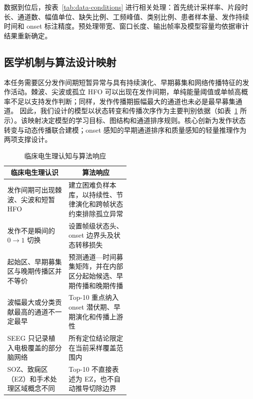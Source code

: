 \documentclass{cumcmthesis}
\numberwithin{figure}{section} %
\numberwithin{table}{section} %
\begin{document}
数据到位后，按表~\ref{tab:data-conditions} 进行相关处理：首先统计采样率、片段时长、通道数、幅值单位、缺失比例、工频峰值、类别比例、患者样本量、发作持续时间和 onset 标注精度。预处理带宽、窗口长度、输出帧率及模型容量均依据审计结果重新确定。


\subsection{医学机制与算法设计映射}

本任务需要区分发作间期短暂异常与具有持续演化、早期募集和网络传播特征的发作活动。棘波、尖波或孤立 HFO 可以出现在发作间期，单纯能量阈值或单帧高概率不足以支持发作判断；同样，发作传播期振幅最大的通道也未必是最早募集通道。
因此，我们设计的模型以状态转变和传播次序作为主要判别依据（如表~\ref{tab:clinical-response} 所示）。该映射决定模型的学习目标、图结构和通道排序规则。核心创新为发作状态转变与动态传播联合建模；onset 感知的早期通道排序和质量感知的轻量推理作为两项支撑设计。

\begin{table}[htbp]
    \centering
    \caption{临床电生理认知与算法响应}
    \label{tab:clinical-response}

    \renewcommand{\arraystretch}{1.5}
    \setlength{\tabcolsep}{5pt}

    \begin{tabularx}{\linewidth}{@{}
        p{0.50\linewidth}
        X
    @{}}
        \toprule[1pt]
        \multicolumn{1}{c}{\textbf{临床电生理认识}} &
        \multicolumn{1}{c}{\textbf{算法响应}} \\
        \midrule

        发作间期可出现棘波、尖波和短暂 HFO	 &建立困难负样本库，以持续性、节律演化和跨帧状态约束排除孤立异常 \\
        发作不是瞬间的 $0\rightarrow1$ 切换	 &设置帧级状态头、onset 边界头及状态转移损失 \\
        起始区、早期募集区与晚期传播区并不等价 &	预测通道—时间募集矩阵，并在内部区分起始候选、早期传播和晚期传播 \\
        波幅最大或分类贡献最高的通道不一定最早	 &Top-10 重点纳入 onset 潜伏期、早期演化和传播上游性 \\
        SEEG 只记录植入电极覆盖的部分脑网络	 &所有定位结论限定在当前采样覆盖范围内 \\
        SOZ、致痫区（EZ）和手术处理区域概念不同 &	Top-10 不直接表述为 EZ，也不自动推导切除边界\\
        \bottomrule[1pt]

    \end{tabularx}
\end{table}
\end{document}
